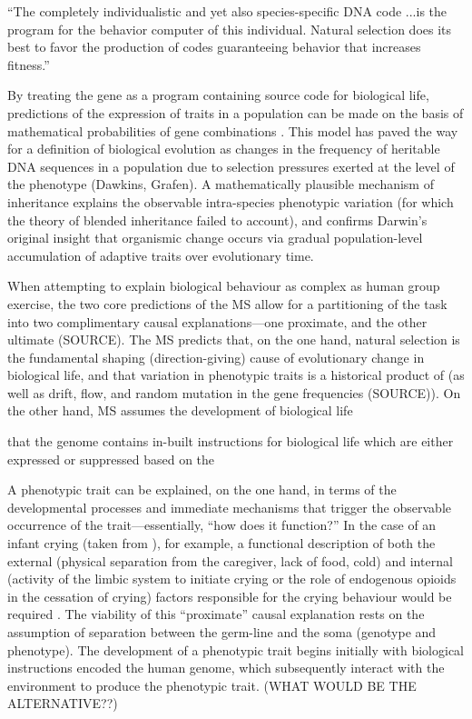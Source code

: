 ``The completely individualistic and yet also species-specific DNA code ...is the program for the behavior computer of this individual. Natural selection does its best to favor the production of codes guaranteeing behavior that increases fitness.''

By treating the gene as a program containing source code for biological life, predictions of the expression of traits in a population can be made on the basis of mathematical probabilities of gene combinations \citep{Dawkins1972;Dawkins1982}. This model has paved the way for a definition of biological evolution as changes in the frequency of heritable DNA sequences in a population due to selection pressures exerted at the level of the phenotype (Dawkins, Grafen). A mathematically plausible mechanism of inheritance explains the observable intra-species phenotypic variation (for which the theory of blended inheritance failed to account), and confirms Darwin's original insight that organismic change occurs via gradual population-level accumulation of adaptive traits over evolutionary time.


When attempting to explain biological behaviour as complex as human group exercise, the two core predictions of the MS allow for a partitioning of the task into two complimentary causal explanations---one proximate, and the other ultimate (SOURCE). The MS predicts that, on the one hand, natural selection is the fundamental shaping (direction-giving) cause of evolutionary change in biological life, and that variation in phenotypic traits is a historical product of (as well as drift, flow, and random mutation in the gene frequencies (SOURCE)).  On the other hand, MS assumes the development of biological life

 that the genome contains in-built instructions for biological life which are either expressed or suppressed based on the

A phenotypic trait can be explained, on the one hand, in terms of the developmental processes and immediate mechanisms that trigger the observable occurrence of the trait---essentially, ``how does it function?'' \citep{Mayr1961,Tinbergen1963} In the case of an infant crying (taken from \citep{Scott-Phillips2011,Nettle2009,Zeifman2001}), for example, a functional description of both the external (physical separation from the caregiver, lack of food, cold) and internal (activity of the limbic system to initiate crying or the role of endogenous opioids in the cessation of crying) factors responsible for the crying behaviour would be required \citep[38]{Scott-Phillips2011}. The viability of this ``proximate'' causal explanation rests on the assumption of separation between the germ-line and the soma (genotype and phenotype). The development of a phenotypic trait begins initially with biological instructions encoded the human genome, which subsequently interact with the environment to produce the phenotypic trait.   (WHAT WOULD BE THE ALTERNATIVE??)

